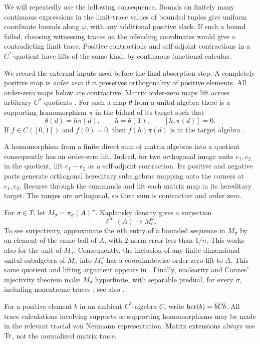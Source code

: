 We will repeatedly use the following consequence. Bounds on finitely many
continuous expressions in the limit-trace values of bounded tuples give
uniform coordinate bounds along $\omega$, with any additional positive
slack. If such a bound failed, choosing witnessing traces on the offending
coordinates would give a contradicting limit trace. Positive contractions
and self-adjoint contractions in a $C^*$-quotient have lifts of the same
kind, by continuous functional calculus.

We record the external inputs used before the final absorption step.
A completely positive map is \emph{order zero} if it preserves
orthogonality of positive elements. All order-zero maps below are
contractive. Matrix order-zero maps lift across
arbitrary $C^*$-quotients \cite[Proposition 1.8]{CETW}. For such a map
$\theta$ from a unital algebra there is a supporting homomorphism $\pi$
in the bidual of its target such that
\[
 \theta(d)=h\pi(d),\qquad h=\theta(1),\qquad [h,\pi(d)]=0.
\]
If $f\in C([0,1])$ and $f(0)=0$, then $f(h)\pi(d)$ is in the target
algebra \cite[Theorem 3.3 and Corollary 4.2]{WZ}.

A homomorphism from a finite direct sum of matrix algebras into a quotient
consequently has an order-zero lift. Indeed, for two orthogonal image units
$e_1,e_2$ in the quotient, lift
$e_1-e_2$ as a self-adjoint contraction. Its positive and negative parts
generate orthogonal hereditary subalgebras mapping onto the corners at
$e_1,e_2$. Recurse through the summands and lift each matrix map in its
hereditary target. The ranges are orthogonal, so their sum is contractive
and order zero.

For $\sigma\in T$, let $M_\sigma=\pi_\sigma(A)''$. Kaplansky density gives
a surjection
\begin{equation}\label{n:eq:kaplansky}
 \ell^\infty(A)\longrightarrow M_\sigma^\omega.
\end{equation}
To see surjectivity, approximate the $n$th entry of a bounded sequence in
$M_\sigma$ by an element of the same ball of $A$, with $2$-norm error less
than $1/n$. This works also for the unit of $M_\sigma$. Consequently,
the inclusion of any finite-dimensional unital subalgebra of $M_\sigma$
into $M_\sigma^\omega$ has a coordinatewise order-zero lift to $A$.
This same quotient and lifting argument appears in
\cite[Proof of Lemma 4.4]{CETW}. Finally, nuclearity and Connes' injectivity theorem
make $M_\sigma$ hyperfinite, with separable predual, for every $\sigma$,
including nonextreme traces \cite{Connes}; see also
\cite[Proof of Lemma 4.5]{CETW}.

For a positive element $b$ in an ambient $C^*$-algebra $C$, write
$\operatorname{her}(b)=\overline{bCb}$.
All trace calculations involving supports or supporting homomorphisms
may be made in the relevant tracial von Neumann representation. Matrix
extensions always use $\operatorname{Tr}$, not the normalized matrix trace.

